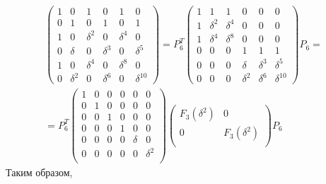 \begin{multline*}
    \begin{pmatrix}
        1 & 0        & 1        & 0        & 1        & 0           \\
        0 & 1        & 0        & 1        & 0        & 1           \\
        1 & 0        & \delta^2 & 0        & \delta^4 & 0           \\
        0 & \delta   & 0        & \delta^3 & 0        & \delta^5    \\
        1 & 0        & \delta^4 & 0        & \delta^8 & 0           \\
        0 & \delta^2 & 0        & \delta^6 & 0        & \delta^{10}
    \end{pmatrix}
    = P_6^T
    \begin{pmatrix}
        1 & 1        & 1        & 0        & 0        & 0           \\
        1 & \delta^2 & \delta^4 & 0        & 0        & 0           \\
        1 & \delta^4 & \delta^8 & 0        & 0        & 0           \\
        0 & 0        & 0        & 1        & 1        & 1           \\
        0 & 0        & 0        & \delta   & \delta^3 & \delta^5    \\
        0 & 0        & 0        & \delta^2 & \delta^6 & \delta^{10}
    \end{pmatrix}
    P_6 = \\
    = P_6^T
    \begin{pmatrix}
        1 & 0 & 0 & 0 & 0      & 0        \\
        0 & 1 & 0 & 0 & 0      & 0        \\
        0 & 0 & 1 & 0 & 0      & 0        \\
        0 & 0 & 0 & 1 & 0      & 0        \\
        0 & 0 & 0 & 0 & \delta & 0        \\
        0 & 0 & 0 & 0 & 0      & \delta^2 \\
    \end{pmatrix}
    \begin{pmatrix}
        F_3(\delta^2) & 0             \\
        0             & F_3(\delta^2) \\
    \end{pmatrix}
    P_6
\end{multline*}
Таким образом,
